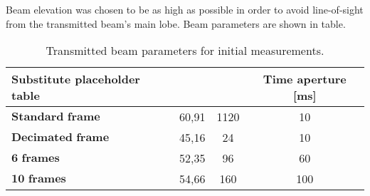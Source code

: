 Beam elevation was chosen to be as high as possible in order to avoid line-of-sight from the transmitted beam's main lobe. Beam parameters are shown in table.


\begin{table}[H]
	\centering 
	\begin{tabular}{|p{9em} c c c |}
		\hline
		\rowcolor{bluepoli!40} %
		\textbf{Substitute placeholder table} & \textbf{} & \textbf{} & \textbf{Time aperture [ms]} \T\B \\
		\hline \hline
		$\textbf{Standard frame}$ & 60,91 & 1120 & 10 \T\B \\
		$\textbf{Decimated frame}$ & 45,16 & 24 & 10 \T\B\\
		$\textbf{6 frames}$ & 52,35 & 96 & 60  \T\B\\
		$\textbf{10 frames}$ & 54,66 & 160 & 100  \T\B\\
		
		\hline
	\end{tabular}
	\\[10pt]
	\caption{Transmitted beam parameters for initial measurements.}
	\label{table:TXBeamParams}
\end{table}



